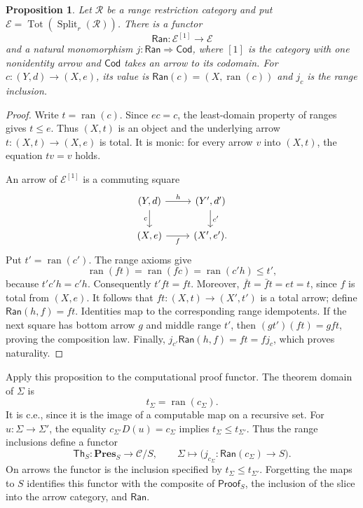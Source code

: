 \documentclass[11pt]{article}
\newtheorem{proposition}[theorem]{Proposition}
\theoremstyle{definition}
\theoremstyle{remark}
\newcommand{\R}{\mathscr R}
\newcommand{\ran}{\operatorname{ran}}
\newcommand{\Tot}{\operatorname{Tot}}
\begin{document}
\begin{proposition}\label{poly:range-functor}
Let $\R$ be a range restriction category and put
$\mathscr E=\Tot(\operatorname{Split}_r(\R))$. There is a functor
\[
 \mathsf{Ran}:\mathscr E^{[1]}\longrightarrow\mathscr E
\]
and a natural monomorphism
$j:\mathsf{Ran}\Rightarrow\mathsf{Cod}$, where $[1]$ is the category
with one nonidentity arrow and $\mathsf{Cod}$ takes an arrow to its
codomain. For $c:(Y,d)\to(X,e)$, its value is
$\mathsf{Ran}(c)=(X,\ran(c))$ and $j_c$ is the range inclusion.
\end{proposition}
\begin{proof}
Write $t=\ran(c)$. Since $ec=c$, the least-domain property of ranges
gives $t\le e$. Thus $(X,t)$ is an object and the underlying arrow
$t:(X,t)\to(X,e)$ is total. It is monic: for every arrow $v$ into
$(X,t)$, the equation $tv=v$ holds.

An arrow of $\mathscr E^{[1]}$ is a commuting square
\[
 \begin{tikzcd}
 (Y,d)\arrow[r,"h"]\arrow[d,"c"']
   &(Y',d')\arrow[d,"c'"]\\
 (X,e)\arrow[r,"f"']&(X',e').
 \end{tikzcd}
\]
Put $t'=\ran(c')$. The range axioms give
\[
 \ran(ft)=\ran(fc)=\ran(c'h)\le t',
\]
because $t'c'h=c'h$. Consequently $t'ft=ft$. Moreover,
$\overline{ft}=\bar f t=et=t$, since $f$ is total from $(X,e)$.
It follows that $ft:(X,t)\to(X',t')$ is a total arrow; define
$\mathsf{Ran}(h,f)=ft$. Identities map to the corresponding range
idempotents. If the next square has bottom arrow $g$ and middle
range $t'$, then
$(gt')(ft)=gft$, proving the composition law. Finally,
$j_{c'}\mathsf{Ran}(h,f)=ft=fj_c$, which proves naturality.
\end{proof}

Apply this proposition to the computational proof functor. The theorem
domain of $\Sigma$ is
\[
 t_\Sigma=\ran(c_\Sigma).
\]
It is c.e., since it is the image of a computable map on a recursive
set. For $u:\Sigma\to\Sigma'$, the equality
$c_{\Sigma'}D(u)=c_\Sigma$ implies
$t_\Sigma\le t_{\Sigma'}$. Thus the range inclusions define a functor
\[
 \mathsf{Th}_S:\mathbf{Pres}_S\longrightarrow\mathscr C/S,
 \qquad
 \Sigma\longmapsto\bigl(j_{c_\Sigma}:
       \mathsf{Ran}(c_\Sigma)\longrightarrow S\bigr).
\]
On arrows the functor is the inclusion specified by
$t_\Sigma\le t_{\Sigma'}$. Forgetting
the maps to $S$ identifies this functor with the composite of
$\mathsf{Proof}_S$, the inclusion of the slice into the arrow category,
and $\mathsf{Ran}$.
\end{document}
